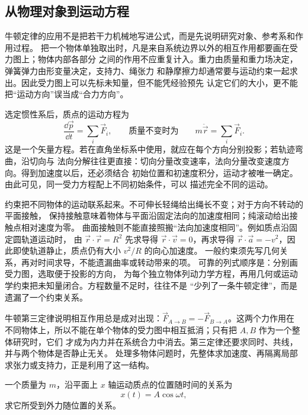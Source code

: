{\subsection{从物理对象到运动方程}

牛顿定律的应用不是把若干力机械地写进公式，而是先说明研究对象、参考系和作用过程。
把一个物体单独取出时，凡是来自系统边界以外的相互作用都要画在受力图上；物体内部各部分
之间的作用不应重复计入。重力由质量和重力场决定，弹簧弹力由形变量决定，支持力、绳张力
和静摩擦力却通常要与运动约束一起求出。因此受力图上可以先标未知量，但不能凭经验预先
认定它们的大小，更不能把“运动方向”误当成“合力方向”。

选定惯性系后，质点的运动方程为
\begin{equation}
 \frac{\dd\vec p}{\dd t}=\sum_i\vec F_i,
 \qquad\text{质量不变时为}\qquad
 m\ddot{\vec r}=\sum_i\vec F_i.
\end{equation}
这是一个矢量方程。若在直角坐标系中使用，就应在每个方向分别投影；若轨迹弯曲，沿切向与
法向分解往往更直接：切向分量改变速率，法向分量改变速度方向。得到加速度以后，还必须结合
初始位置和初速度积分，运动才被唯一确定。由此可见，同一受力方程配上不同初始条件，可以
描述完全不同的运动。

约束把不同物体的运动联系起来。不可伸长轻绳给出绳长不变；对于方向不转动的平面接触，
保持接触意味着物体与平面沿固定法向的加速度相同；纯滚动给出接触点相对速度为零。
曲面接触则不能直接照搬“法向加速度相同”。例如质点沿固定圆轨道运动时，
由 $\vec r\cdot\vec r=R^2$ 先求导得 $\vec r\cdot\vec v=0$，再求导得
$\vec r\cdot\vec a=-v^2$，因此即使轨道静止，质点仍有大小 $v^2/R$ 的向心加速度。
一般约束须先写几何关系，再对时间求导，不能遗漏曲率或转动带来的项。
可靠的列式顺序是：分别画受力图，选取便于投影的方向，
为每个独立物体列动力学方程，再用几何或运动学约束把未知量闭合。方程数量不足时，往往不是
“少列了一条牛顿定律”，而是遗漏了一个约束关系。

牛顿第三定律说明相互作用总是成对出现：$\vec F_{A\to B}=-\vec F_{B\to A}$。这两个力作用在
不同物体上，所以不能在单个物体的受力图中相互抵消；只有把 $A,B$ 作为一个整体研究时，它们
才成为内力并在系统合力中消去。第三定律还要求同时、共线，并与两个物体是否静止无关。
处理多物体问题时，先整体求加速度、再隔离局部求张力或支持力，正是利用了这一结构。


\begin{origexamplebox}{}\label{ch06:ex:s04-2-1}
一个质量为 $m$，沿平面上 $x$ 轴运动质点的位置随时间的关系为
\[
  x(t)=A\cos\omega t,
\]
求它所受到外力随位置的关系。

\begin{qualityfigure}
\label{mech:06:1:q}
\end{qualityfigure}
\end{origexamplebox}

}
